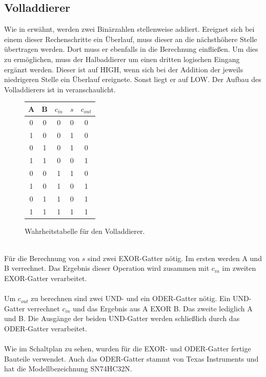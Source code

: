 \subsection{Volladdierer}
Wie in  erwähnt, werden zwei Binärzahlen stellenweise addiert. Ereignet sich bei einem dieser Rechenschritte ein Überlauf, muss dieser an die nächsthöhere Stelle übertragen werden. Dort muss er ebenfalls in die Berechnung einfließen. Um dies zu ermöglichen, muss der Halbaddierer um einen dritten logischen Eingang ergänzt werden. Dieser ist auf HIGH, wenn sich bei der Addition der jeweils niedrigeren Stelle ein Überlauf ereignete. Sonst liegt er auf LOW. Der Aufbau des Volladdierers ist in \cite{zimmermann1998binary} veranschaulicht.\\
\begin{figure}
	\centering
	\begin{tabular}{|c|c|c|c|c|}
		\hline
		\textbf{A} & \textbf{B} & \textbf{$c_{in}$} & \textbf{$s$} & \textbf{$c_{out}$} \\
		\hline
		0 & 0 & 0 & 0 & 0 \\
		1 & 0 & 0 & 1 & 0 \\
		0 & 1 & 0 & 1 & 0 \\
		1 & 1 & 0 & 0 & 1 \\
		0 & 0 & 1 & 1 & 0 \\
		1 & 0 & 1 & 0 & 1 \\
		0 & 1 & 1 & 0 & 1 \\
		1 & 1 & 1 & 1 & 1 \\
		\hline
	\end{tabular}
	\caption{Wahrheitstabelle für den Volladdierer.}
\end{figure}\\
Für die Berechnung von $s$ sind zwei EXOR-Gatter nötig. Im ersten werden A und B verrechnet. Das Ergebnis dieser Operation wird zusammen mit $c_{in}$ im zweiten EXOR-Gatter verarbeitet.\\\\
Um $c_{out}$ zu berechnen sind zwei UND- und ein ODER-Gatter nötig. Ein UND-Gatter verrechnet $c_{in}$ und das Ergebnis aus A EXOR B. Das zweite lediglich A und B. Die Ausgänge der beiden UND-Gatter werden schließlich durch das ODER-Gatter verarbeitet.\\\\
Wie im Schaltplan zu sehen, wurden für die EXOR- und ODER-Gatter fertige Bauteile verwendet. Auch das ODER-Gatter stammt von Texas Instruments und hat die Modellbezeichnung SN74HC32N.\\\\
